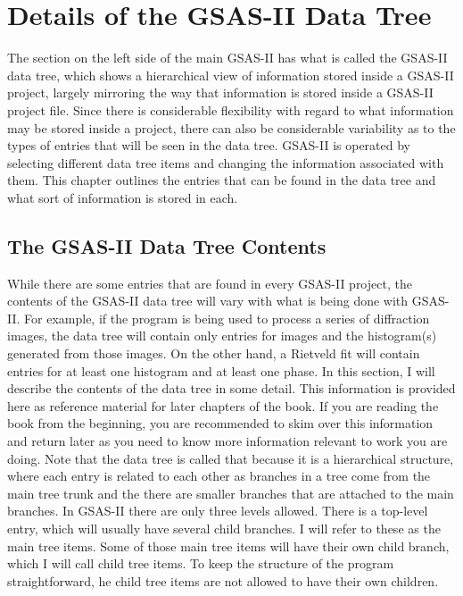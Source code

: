 \chapter{Details of the GSAS-II Data Tree}
\label{Chap:GSASIIdatatree}

The section on the left side of the main GSAS-II has what is called the GSAS-II data tree, which shows a hierarchical view of information stored 
inside a GSAS-II project, largely mirroring the way that information is stored inside a GSAS-II project file. Since there is considerable flexibility with regard to what information may be stored 
inside a project, there can also be considerable variability as to the types of entries that will be seen in the data tree. GSAS-II is operated by selecting different data tree items and changing the information associated with them. This chapter outlines the entries that can be found in the data tree and what sort of information is stored in each. 

\section{The GSAS-II Data Tree Contents}
\label{sec:DataTree}
While there are some entries that are found in every GSAS-II project, the contents of the GSAS-II data tree will vary with what is being done with GSAS-II. 
For example, if the program is being used to process a series of diffraction images, the data tree will contain only entries for images and the histogram(s) generated from those images. On the other hand, 
a Rietveld fit will contain entries for at least one histogram and at least one phase. 
In this section, I will describe the contents of the data tree in some detail. 
This information is provided here as reference material for later chapters of the book. If you are 
reading the book from the beginning, you are recommended to skim over this information and return later as you need to know more information relevant to work you are doing. Note that the data tree is called that because it is a hierarchical structure, where each entry is related to each other as branches in a tree come from the main tree trunk and the there are smaller branches that are attached to the main branches. In GSAS-II there are only three levels allowed. There is a top-level entry, which will usually have several child branches. I will refer to these as the main tree items. Some of those main tree items will have their own child branch, which I will call child tree items. To keep the structure of the program straightforward, he child tree items are not allowed to have their own children. 

